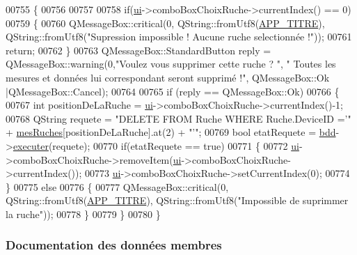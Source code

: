 \begin{DoxyCode}
00755 \{
00756 
00757 
00758    \textcolor{keywordflow}{if}(\hyperlink{class_ruche_ihm_a64786058bd7f88ca2f1e9743bb27c25b}{ui}->comboBoxChoixRuche->currentIndex() == 0)
00759    \{
00760        QMessageBox::critical(0, QString::fromUtf8(\hyperlink{parametres_8h_ace364d1ce44aa9f79bcff6e3752c4a5f}{APP\_TITRE}), QString::fromUtf8(\textcolor{stringliteral}{"Supression
       impossible ! Aucune ruche selectionnée !"}));
00761        \textcolor{keywordflow}{return};
00762    \}
00763    QMessageBox::StandardButton reply = QMessageBox::warning(0,\textcolor{stringliteral}{"Voulez vous supprimer cette ruche ? "}, \textcolor{stringliteral}{"
      Toutes les mesures et données lui correspondant seront supprimé !"}, QMessageBox::Ok |QMessageBox::Cancel);
00764 
00765     \textcolor{keywordflow}{if} (reply == QMessageBox::Ok)
00766     \{
00767         \textcolor{keywordtype}{int} positionDeLaRuche = \hyperlink{class_ruche_ihm_a64786058bd7f88ca2f1e9743bb27c25b}{ui}->comboBoxChoixRuche->currentIndex()-1;
00768         QString requete = \textcolor{stringliteral}{"DELETE FROM Ruche WHERE Ruche.DeviceID ='"} + 
      \hyperlink{class_ruche_ihm_ab7741fa67b19cbb2da7eb12c58cf83c1}{mesRuches}[positionDeLaRuche].at(2) + \textcolor{stringliteral}{"'"};
00769         \textcolor{keywordtype}{bool} etatRequete = \hyperlink{class_ruche_ihm_a0851936fe212e8d40538264f09749153}{bdd}->\hyperlink{class_base_de_donnees_aa8de5f8f8bb17edc43f5c0ee33712081}{executer}(requete);
00770         \textcolor{keywordflow}{if}(etatRequete == \textcolor{keyword}{true})
00771         \{
00772             \hyperlink{class_ruche_ihm_a64786058bd7f88ca2f1e9743bb27c25b}{ui}->comboBoxChoixRuche->removeItem(\hyperlink{class_ruche_ihm_a64786058bd7f88ca2f1e9743bb27c25b}{ui}->comboBoxChoixRuche->currentIndex());
00773             \hyperlink{class_ruche_ihm_a64786058bd7f88ca2f1e9743bb27c25b}{ui}->comboBoxChoixRuche->setCurrentIndex(0);
00774         \}
00775         \textcolor{keywordflow}{else}
00776         \{
00777             QMessageBox::critical(0, QString::fromUtf8(\hyperlink{parametres_8h_ace364d1ce44aa9f79bcff6e3752c4a5f}{APP\_TITRE}), QString::fromUtf8(\textcolor{stringliteral}{"Impossible
       de suprimmer la ruche"}));
00778         \}
00779     \}
00780 \}
\end{DoxyCode}


\subsubsection{Documentation des données membres}
\mbox{\label{class_ruche_ihm_a0851936fe212e8d40538264f09749153}} 
